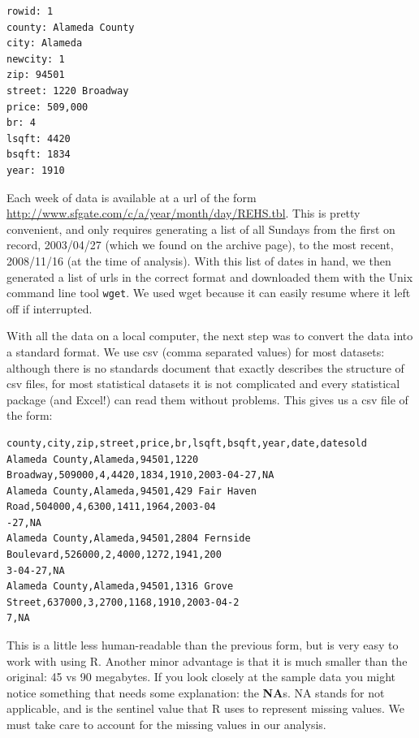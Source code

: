 \documentclass[oneside]{article}
\begin{document}
\begin{verbatim}
rowid: 1
county: Alameda County
city: Alameda
newcity: 1
zip: 94501
street: 1220 Broadway
price: 509,000
br: 4
lsqft: 4420
bsqft: 1834
year: 1910
\end{verbatim}

Each week of data is available at a url of the form \url{http://www.sfgate.com/c/a/year/month/day/REHS.tbl}.  This is pretty convenient, and only requires generating a list of all Sundays from the first on record, 2003/04/27 (which we found on the archive page), to the most recent, 2008/11/16 (at the time of analysis).  With this list of dates in hand, we then generated a list of urls in the correct format and downloaded them with the Unix command line tool {\tt wget}. We used wget because it can easily resume where it left off if interrupted.

With all the data on a local computer, the next step was to convert the data into a standard format.  We use csv (comma separated values) for most datasets: although there is no standards document that exactly describes the structure of csv files, for most statistical datasets it is not complicated and every statistical package (and Excel!) can read them without problems.  This gives us a csv file of the form:

\begin{verbatim}
county,city,zip,street,price,br,lsqft,bsqft,year,date,datesold
Alameda County,Alameda,94501,1220 Broadway,509000,4,4420,1834,1910,2003-04-27,NA
Alameda County,Alameda,94501,429 Fair Haven Road,504000,4,6300,1411,1964,2003-04
-27,NA
Alameda County,Alameda,94501,2804 Fernside Boulevard,526000,2,4000,1272,1941,200
3-04-27,NA
Alameda County,Alameda,94501,1316 Grove Street,637000,3,2700,1168,1910,2003-04-2
7,NA
\end{verbatim}

This is a little less human-readable than the previous form, but is very easy to work with using R.  Another minor advantage is that it is much smaller than the original:  45 vs 90 megabytes.  If you look closely at the sample data you might notice something that needs some explanation: the {\bf NA}s.  NA stands for not applicable, and is the sentinel value that R uses to represent missing values. We must take care to account for the missing values in our analysis.
\end{document}
